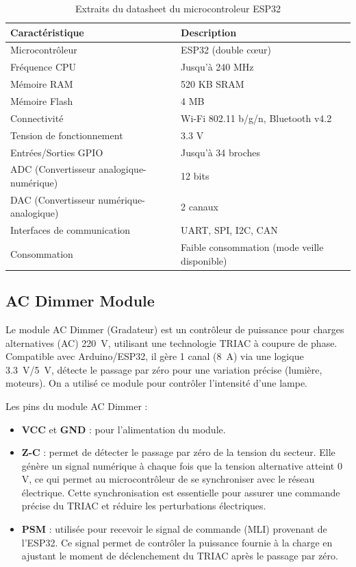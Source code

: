\begin{table}[H]
	\centering
	\caption{Extraits du datasheet du microcontroleur ESP32}
	\begin{tabular}{|l|l|}
		\hline
		\textbf{Caractéristique} & \textbf{Description} \\ \hline
		Microcontrôleur & ESP32 (double cœur) \\ \hline
		Fréquence CPU & Jusqu'à 240 MHz \\ \hline
		Mémoire RAM & 520 KB SRAM \\ \hline
		Mémoire Flash & 4 MB \\ \hline
		Connectivité & Wi-Fi 802.11 b/g/n, Bluetooth v4.2 \\ \hline
		Tension de fonctionnement & 3.3 V \\ \hline
		Entrées/Sorties GPIO & Jusqu'à 34 broches \\ \hline
		ADC (Convertisseur analogique-numérique) & 12 bits \\ \hline
		DAC (Convertisseur numérique-analogique) & 2 canaux \\ \hline
		Interfaces de communication & UART, SPI, I2C, CAN \\ \hline
		Consommation & Faible consommation (mode veille disponible) \\ \hline
	\end{tabular}
\end{table}

\subsection{AC Dimmer Module}

Le module AC Dimmer (Gradateur) est un contrôleur de puissance pour charges alternatives (AC) 220~V, utilisant une technologie TRIAC à coupure de phase. Compatible avec Arduino/ESP32, il gère 1 canal (8~A) via une logique 3.3~V/5~V, détecte le passage par zéro pour une variation précise (lumière, moteurs). On a utilisé ce module pour contrôler l'intensité d'une lampe.

Les pins du module AC Dimmer :

\begin{itemize}[label=$\bullet$]
	\item \textbf{VCC} et \textbf{GND} : pour l'alimentation du module.
	\item \textbf{Z-C} : permet de détecter le passage par zéro de la tension du secteur. Elle génère un signal numérique à chaque fois que la tension alternative atteint 0 V, ce qui permet au microcontrôleur de se synchroniser avec le réseau électrique. Cette synchronisation est essentielle pour assurer une commande précise du TRIAC et réduire les perturbations électriques.
	\item \textbf{PSM} : utilisée pour recevoir le signal de commande (MLI) provenant de l'ESP32. Ce signal permet de contrôler la puissance fournie à la charge en ajustant le moment de déclenchement du TRIAC après le passage par zéro.
\end{itemize}

